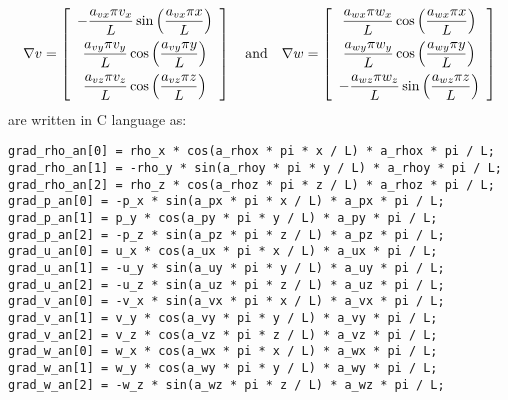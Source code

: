 \documentclass[10pt]{article}
\begin{document}
\begin{landscape}
\begin{equation}
\nabla  v= \left[ \begin{array}{c}
-  \dfrac{  a_{vx}  \pi v_x}{L}  \sin\left( \dfrac{ a_{vx}  \pi  x}{L}\right)\vspace{5pt}\\
    \dfrac{  a_{vy}  \pi v_y}{L} \cos\left( \dfrac{ a_{vy}  \pi  y}{L}\right)\vspace{5pt}\\
   \dfrac{  a_{vz}  \pi v_z }{L} \cos\left( \dfrac{ a_{vz}  \pi  z}{L}\right)
\end{array} \right]
\quad\mbox{and}\quad
\nabla w = \left[ \begin{array}{c}
\dfrac{  a_{wx}  \pi  w_x}{L} \cos\left( \dfrac{ a_{wx}  \pi  x}{L}\right)\vspace{5pt}\\
  \dfrac{  a_{wy}  \pi w_y}{L}  \cos\left( \dfrac{ a_{wy}  \pi  y}{L}\right)\vspace{5pt} \\
 - \dfrac{  a_{wz}  \pi w_z}{L}  \sin\left( \dfrac{ a_{wz}  \pi  z}{L}\right)
\end{array} \right]
\end{equation}
are written in C language as:
\begin{verbatim}
grad_rho_an[0] = rho_x * cos(a_rhox * pi * x / L) * a_rhox * pi / L;
grad_rho_an[1] = -rho_y * sin(a_rhoy * pi * y / L) * a_rhoy * pi / L;
grad_rho_an[2] = rho_z * cos(a_rhoz * pi * z / L) * a_rhoz * pi / L;
grad_p_an[0] = -p_x * sin(a_px * pi * x / L) * a_px * pi / L;
grad_p_an[1] = p_y * cos(a_py * pi * y / L) * a_py * pi / L;
grad_p_an[2] = -p_z * sin(a_pz * pi * z / L) * a_pz * pi / L;
grad_u_an[0] = u_x * cos(a_ux * pi * x / L) * a_ux * pi / L;
grad_u_an[1] = -u_y * sin(a_uy * pi * y / L) * a_uy * pi / L;
grad_u_an[2] = -u_z * sin(a_uz * pi * z / L) * a_uz * pi / L;
grad_v_an[0] = -v_x * sin(a_vx * pi * x / L) * a_vx * pi / L;
grad_v_an[1] = v_y * cos(a_vy * pi * y / L) * a_vy * pi / L;
grad_v_an[2] = v_z * cos(a_vz * pi * z / L) * a_vz * pi / L;
grad_w_an[0] = w_x * cos(a_wx * pi * x / L) * a_wx * pi / L;
grad_w_an[1] = w_y * cos(a_wy * pi * y / L) * a_wy * pi / L;
grad_w_an[2] = -w_z * sin(a_wz * pi * z / L) * a_wz * pi / L;
\end{verbatim}

 


\end{landscape}
\end{document}
